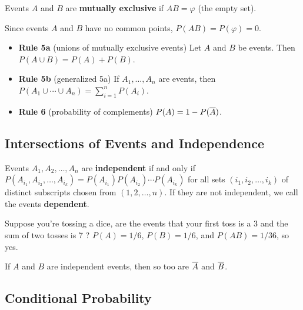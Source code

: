 \documentclass[english, 11pt]{article}
\begin{document}
  \begin{defn}\label{mutually exclusive}
    Events $A$ and $B$ are \textbf{mutually exclusive} if $AB = \varphi$ (the empty set).
  \end{defn}

  Since  events $A$ and $B$ have no common points, $P(AB) = P(\varphi) = 0$.

  \begin{itemize}
    \item {\bf Rule 5a} (unions of mutually exclusive events) Let $A$ and $B$ be  events. Then $P(A \cup B) = P(A) + P(B)$.
    \item {\bf Rule 5b} (generalized 5a) If $A_1, \ldots, A_n$ are  events, then $P(A_1\cup\cdots\cup A_n) = \sum_{i = 1}^n P(A_i)$.
    \item {\bf Rule 6} (probability of complements) $P(A) = 1- P(\overline{A})$.
  \end{itemize}

  \subsection{Intersections of Events and Independence}

  \begin{defn}[independent]\label{independent}
    Events $A_1, A_2, \ldots, A_n$ are {\bf independent} if and only if $P(A_{i_1}, A_{i_2}, \ldots, A_{i_k})  = P(A_{i_1})P(A_{i_2})\cdots P(A_{i_k})$ for all sets $(i_1, i_2, \ldots, i_k)$ of distinct subscripts chosen from $(1,2,\ldots,n)$. If they are not independent, we call the events {\bf dependent}.
  \end{defn}

  \begin{exmp}
    Suppose you're tossing a dice, are the events that your first toss is a 3 and the sum of two tosses is 7 ? $P(A) = 1/6$, $P(B) = 1/6$, and $P(AB) = 1/36$, so yes.
  \end{exmp}

  \begin{thrm}
    If $A$ and $B$ are independent events, then so too are $\overline{A}$ and $\overline{B}$.
  \end{thrm}

  \subsection{Conditional Probability}
\end{document}
